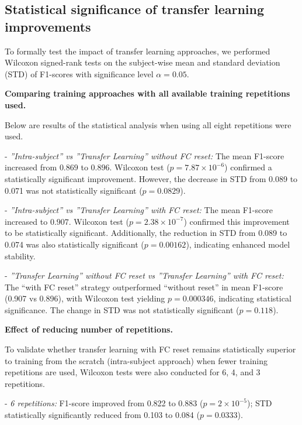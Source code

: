 \begin{multicols}{2}

\subsection*{Statistical significance of transfer learning improvements}

To formally test the impact of transfer learning approaches, we performed Wilcoxon signed-rank tests on the subject-wise mean and standard deviation (STD) of F1-scores with significance level $\alpha = 0.05$.\newline

\textbf{Comparing training approaches with all available training repetitions used.}  

Below are results of the statistical analysis when using all eight repetitions were used.

- \textit{''Intra-subject'' vs ''Transfer Learning'' without FC reset:} The mean F1-score increased from $0.869$ to $0.896$. Wilcoxon test ($p = 7.87 \times 10^{-6}$) confirmed a statistically significant improvement. However, the decrease in STD from 0.089 to 0.071 was not statistically significant ($p = 0.0829$).

- \textit{''Intra-subject'' vs ''Transfer Learning'' with FC reset:} The mean F1-score increased to $0.907$. Wilcoxon test ($p = 2.38 \times 10^{-7}$) confirmed this improvement to be statistically significant. Additionally, the reduction in STD from 0.089 to 0.074 was also statistically significant ($p = 0.00162$), indicating enhanced model stability.

- \textit{''Transfer Learning'' without FC reset vs ''Transfer Learning'' with FC reset:} The ``with FC reset'' strategy outperformed ``without reset'' in mean F1-score (0.907 vs 0.896), with Wilcoxon test yielding $p = 0.000346$, indicating statistical significance. The change in STD was not statistically significant ($p = 0.118$).\newline

\textbf{Effect of reducing number of repetitions.}  

To validate whether transfer learning with FC reset remains statistically superior to training from the scratch (intra-subject approach) when fewer training repetitions are used, Wilcoxon tests were also conducted for 6, 4, and 3 repetitions.

- \textit{6 repetitions:} F1-score improved from 0.822 to 0.883 ($p = 2 \times 10^{-5}$); STD statistically significantly reduced from 0.103 to 0.084 ($p = 0.0333$).


\end{multicols}
